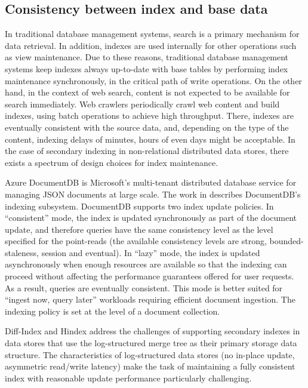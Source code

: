 \subsection{Consistency between index and base data}

In traditional database management systems, search is a primary mechanism for data retrieval.
In addition, indexes are used internally for other operations such as view maintenance.
Due to these reasons, traditional database management systems keep indexes always up-to-date with base tables by performing
index maintenance synchronously, in the critical path of write operations.
On the other hand, in the context of web search, content is not expected to be available for search immediately.
Web crawlers periodically crawl web content and build indexes, using batch operations to achieve high throughput.
There, indexes are eventually consistent with the source data, and, depending on the type of the content,
indexing delays of minutes, hours of even days might be acceptable.
In the case of secondary indexing in non-relational distributed data stores,
there exists a spectrum of design choices for index maintenance.

\bibskip
\noindent

Azure DocumentDB is Microsoft’s multi-tenant distributed database service for managing JSON documents at large scale.
The work in \cite{shukla:schemaagnostic} describes DocumentDB's indexing subsystem.
DocumentDB supports two index update policies.
In ``consistent'' mode, the index is updated synchronously as part of the document update, and therefore
queries have the same consistency level as the level specified for the point-reads
(the available consistency levels are strong, bounded-staleness, session and eventual).
In ``lazy'' mode, the index is updated asynchronously when enough resources are available so that the indexing can proceed
without affecting the performance guarantees offered for user requests.
As a result, queries are eventually consistent.
This mode is better suited for ``ingest now, query later'' workloads requiring efficient document ingestion.
The indexing policy is set at the level of a document collection.

\bibskip
\noindent

Diff-Index \cite{tan:diffindex} and Hindex \cite{tang:deferredindexing} address the challenges of supporting secondary
indexes in data stores that use the log-structured merge tree as their primary storage data structure.
The characteristics of log-structured data stores (no in-place update, asymmetric read/write latency)
make the task of maintaining a fully consistent index with reasonable update performance particularly challenging.

